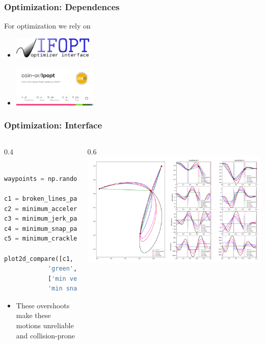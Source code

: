 \begin{frame}[t]
	\frametitle{Optimization: Dependences}

	For optimization we rely on
	\begin{itemize}
		\item \includegraphics[height=1cm]{images/ifopt.png}
		\item \includegraphics[height=2cm]{images/Ipopt.png}
	\end{itemize}
\end{frame}


\begin{frame}[fragile]
	\frametitle{Optimization: Interface}
	\begin{columns}
		\begin{column}{0.4\textwidth}
			\begin{lstlisting}[language=python]

waypoints = np.random.rand(4, 2)

c1 = broken_lines_path(waypoints)
c2 = minimum_acceleration_path(waypoints)
c3 = minimum_jerk_path(waypoints)
c4 = minimum_snap_path(waypoints)
c5 = minimum_crackle_path(waypoints)

plot2d_compare([c1, c2, c3, c4, c5], [
            'green', 'blue', 'magenta', 'red', 'black'],
            ['min vel', 'min acceleration', 'min jerk',
            'min snap', 'min crackle'])

    \end{lstlisting}
			\begin{itemize}
				\item These overshoots make these motions unreliable and collision-prone
			\end{itemize}
		\end{column}
		\begin{column}{0.6\textwidth}
			\includegraphics[width=\textwidth]{./images/comparison.png}
		\end{column}
	\end{columns}

\end{frame}

